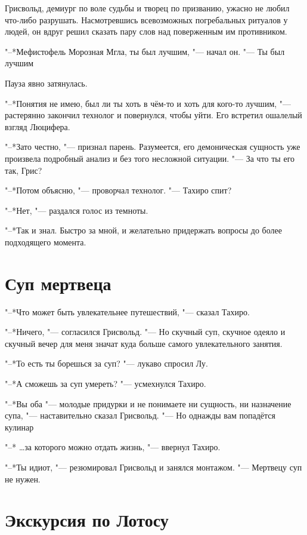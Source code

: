 \documentclass[a4paper,10pt,fleqn]{book}
\newcommand{\mulang}[3]{#2}%
\newcommand{\ldotst}{\so{...}\xspace}
\begin{document}
Грисвольд, демиург по воле судьбы и творец по призванию, ужасно не любил что-либо разрушать.
Насмотревшись всевозможных погребальных ритуалов у людей, он вдруг решил сказать пару слов над поверженным им противником.

"--*Мефистофель Морозная Мгла, ты был лучшим, "--- начал он.
"--- Ты был лучшим\ldotst

Пауза явно затянулась.

\mulang{}{"--*Понятия не имею, был ли ты хоть в чём-то и хоть для кого-то лучшим, "--- растерянно закончил технолог и повернулся, чтобы уйти.}
{``I've no idea if you were good at something or for somebody,'' confused Griswold finished, then turned around to leave.}
Его встретил ошалелый взгляд Люцифера.

\mulang{}{"--*Зато честно, "--- признал парень.}
{``You're honest, anyway,'' Lu declared.}
Разумеется, его демоническая сущность уже произвела подробный анализ и без того несложной ситуации.
"--- За что ты его так, Грис?

"--*Потом объясню, "--- проворчал технолог.
"--- Тахиро спит?

"--*Нет, "--- раздался голос из темноты.

"--*Так и знал.
Быстро за мной, и желательно придержать вопросы до более подходящего момента.

\section{Суп мертвеца}

"--*Что может быть увлекательнее путешествий, "--- сказал Тахиро.

"--*Ничего, "--- согласился Грисвольд.
"--- Но скучный суп, скучное одеяло и скучный вечер для меня значат куда больше самого увлекательного занятия.

"--*То есть ты борешься за суп? "--- лукаво спросил Лу.

"--*А сможешь за суп умереть? "--- усмехнулся Тахиро.

"--*Вы оба "--- молодые придурки и не понимаете ни сущность, ни назначение супа, "--- наставительно сказал Грисвольд.
"--- Но однажды вам попадётся кулинар\ldotst

"--* \dots за которого можно отдать жизнь, "--- ввернул Тахиро.

"--*Ты идиот, "--- резюмировал Грисвольд и занялся монтажом.
"--- Мертвецу суп не нужен.

\section{Экскурсия по Лотосу}
\end{document}
